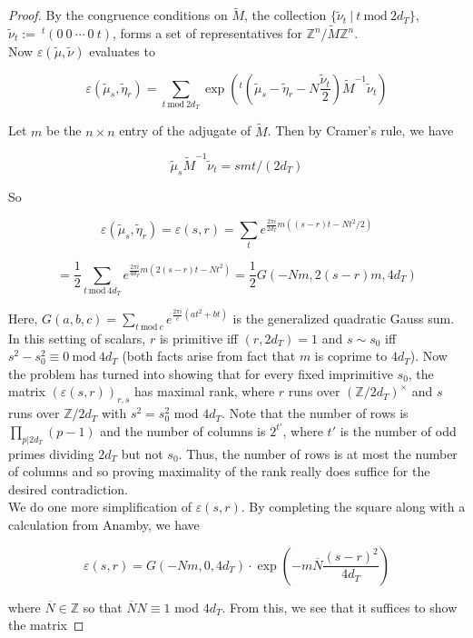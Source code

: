 \documentclass[11pt]{article}
\theoremstyle{definition}
\theoremstyle{remark}
\newcommand{\Z}{\mathbb{Z}}
\begin{document}
\begin{proof}
By the congruence conditions on $\widetilde{M}$, the collection $\{\tilde{\nu}_t \ \vert \ t \ \text{mod} \ 2d_T\}$, $\tilde{\nu}_t := \ ^t (0 \ 0 \ \cdots \ 0 \ t)$, forms a set of representatives for $\mathbb{Z}^{n} / \widetilde{M}\mathbb{Z}^{n}$.\\

Now $\varepsilon(\tilde{\mu},\tilde{\nu})$ evaluates to 

\[
\varepsilon(\tilde{\mu}_s,\tilde{\eta}_r) = \sum_{t \ \text{mod} \ 2d_T} \exp\left( ^t(\tilde{\mu}_s - \tilde{\eta}_r - N\frac{\tilde{\nu}_t}{2}) \widetilde{M}^{-1} \tilde{\nu}_t\right)
\]

Let $m$ be the $n \times n$ entry of the adjugate of $\widetilde{M}$. Then by Cramer's rule, we have

\[
\tilde{\mu}_s \widetilde{M}^{-1} \tilde{\nu}_t = smt / (2d_T)
\]

So 

\[
\varepsilon(\tilde{\mu}_s,\tilde{\eta}_r) = \varepsilon(s,r) = \sum_t e^{\frac{2\pi i }{2 d_T} m((s-r)t  - Nt^2/2)}
\]

\[
= \frac{1}{2} \sum_{t \ \text{mod} \ 4 d_T} e^{\frac{2\pi i }{4 d_T} m(2(s-r)t  - Nt^2)} = \frac{1}{2} G(-Nm, 2(s-r)m, 4d_T)
\]

Here, $G(a,b,c) = \sum_{t \ \text{mod} \ c} e^{\frac{2\pi i }{c} (at^2 + bt)}$ is the generalized quadratic Gauss sum. In this setting of scalars, $r$ is primitive iff $(r,2d_T) = 1$ and $s \sim s_0$ iff $s^2 - s_0^2 \equiv 0 \ \text{mod} \ 4d_T$ (both facts arise from fact that $m$ is coprime to $4d_T$). Now the problem has turned into showing that for every fixed imprimitive $s_0$, the matrix $(\varepsilon(s,r))_{r,s}$ has maximal rank, where $r$ runs over $(\mathbb{Z}/2d_T)^\times$ and $s$ runs over $\mathbb{Z}/2d_T$ with $s^2 = s_0^2$ mod $4d_T$. Note that the number of rows is $\prod_{p \vert 2d_T} (p-1)$ and the number of columns is $2^{t'}$, where $t'$ is the number of odd primes dividing $2d_T$ but not $s_0$. Thus, the number of rows is at most the number of columns and so proving maximality of the rank really does suffice for the desired contradiction. \\

We do one more simplification of $\varepsilon(s,r)$. By completing the square along with a calculation from Anamby, we have 

\[
\varepsilon(s,r) = G(-Nm,0,4d_T) \cdot \exp \left({-m \overline{N} \frac{(s-r)^2}{4d_T}}\right)
\]

where $\overline{N} \in \Z$ so that $\overline{N} N \equiv 1$ mod $4d_T$. From this, we see that it suffices to show the matrix 


\end{proof}
\end{document}
